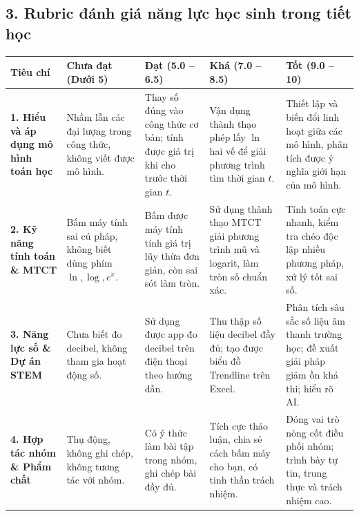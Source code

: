 \documentclass[12pt, a4paper]{article}
\begin{document}
\subsection*{3. Rubric đánh giá năng lực học sinh trong tiết học}

\begin{center}
\begin{tabularx}{\textwidth}{|p{3cm}|X|X|X|X|}
\hline
\textbf{Tiêu chí} & \textbf{Chưa đạt (Dưới 5)} & \textbf{Đạt (5.0 -- 6.5)} & \textbf{Khá (7.0 -- 8.5)} & \textbf{Tốt (9.0 -- 10)} \\
\hline
\textbf{1. Hiểu và áp dụng mô hình toán học} & Nhầm lẫn các đại lượng trong công thức, không viết được mô hình. & Thay số đúng vào công thức cơ bản; tính được giá trị khi cho trước thời gian $t$. & Vận dụng thành thạo phép lấy $\ln$ hai vế để giải phương trình tìm thời gian $t$. & Thiết lập và biến đổi linh hoạt giữa các mô hình, phân tích được ý nghĩa giới hạn của mô hình. \\
\hline
\textbf{2. Kỹ năng tính toán \& MTCT} & Bấm máy tính sai cú pháp, không biết dùng phím $\ln, \log, e^x$. & Bấm được máy tính tính giá trị lũy thừa đơn giản, còn sai sót làm tròn. & Sử dụng thành thạo MTCT giải phương trình mũ và logarit, làm tròn số chuẩn xác. & Tính toán cực nhanh, kiểm tra chéo độc lập nhiều phương pháp, xử lý tốt sai số. \\
\hline
\textbf{3. Năng lực số \& Dự án STEM} & Chưa biết đo decibel, không tham gia hoạt động số. & Sử dụng được app đo decibel trên điện thoại theo hướng dẫn. & Thu thập số liệu decibel đầy đủ; tạo được biểu đồ Trendline trên Excel. & Phân tích sâu sắc số liệu âm thanh trường học; đề xuất giải pháp giảm ồn khả thi; hiểu rõ AI. \\
\hline
\textbf{4. Hợp tác nhóm \& Phẩm chất} & Thụ động, không ghi chép, không tương tác với nhóm. & Có ý thức làm bài tập trong nhóm, ghi chép bài đầy đủ. & Tích cực thảo luận, chia sẻ cách bấm máy cho bạn, có tinh thần trách nhiệm. & Đóng vai trò nòng cốt điều phối nhóm; trình bày tự tin, trung thực và trách nhiệm cao. \\
\hline
\end{tabularx}
\end{center}
\end{document}
